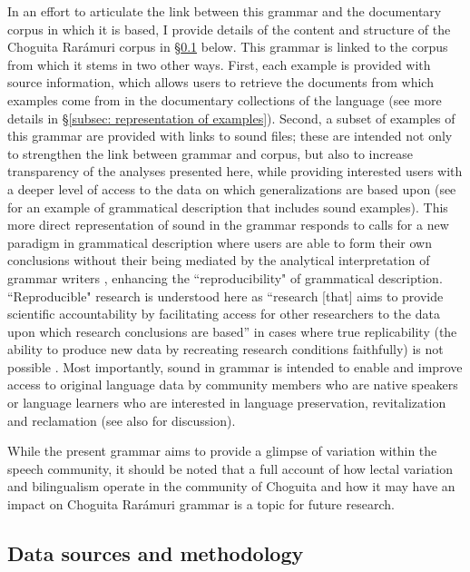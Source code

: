 In an effort to articulate the link between this grammar and the documentary corpus in which it is based, I provide details of the content and structure of the Choguita Rarámuri corpus in §\ref{subsec: data, corpora and methodology} below. This grammar is linked to the corpus from which it stems in two other ways. First, each example is provided with source information, which allows users to retrieve the documents from which examples come from in the documentary collections of the language (see more details in §\ref{subsec: representation of examples}). Second, a subset of examples of this grammar are provided with links to sound files; these are intended not only to strengthen the link between grammar and corpus, but also to increase transparency of the analyses presented here, while providing interested users with a deeper level of access to the data on which generalizations are based upon (see \citet{remijsen2018descriptive} for an example of grammatical description that includes sound examples). This more direct representation of sound in the grammar responds to calls for a new paradigm in grammatical description where users are able to form their own conclusions without their being mediated by the analytical interpretation of grammar writers \citep{rice2014sounds}, enhancing the ``reproducibility" of grammatical description. ``Reproducible" research is understood here as ``research [that] aims to provide scientific accountability by facilitating access for other researchers to the data upon which research conclusions are based” in cases where true replicability (the ability to produce new data by recreating research conditions faithfully) is not possible \citep[4]{berez2018reproducible}. Most importantly, sound in grammar is intended to enable and improve access to original language data by community members who are native speakers or language learners who are interested in language preservation, revitalization and reclamation (see also \citet{rice2014sounds} for discussion).

While the present grammar aims to provide a glimpse of variation within the speech community, it should be noted that a full account of how lectal variation and bilingualism operate in the community of Choguita and how it may have an impact on Choguita Rarámuri grammar is a topic for future research.

\subsection{Data sources and methodology}
\label{subsec: data, corpora and methodology}

